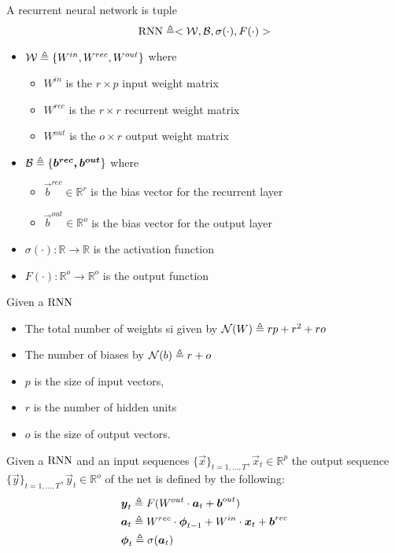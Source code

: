 \begin{defn}
\label{def_rnn}
A recurrent  neural network is tuple
$$\mathrm{RNN}\triangleq< \mathcal{W},\mathcal{B} ,\sigma(\cdot),F(\cdot)>$$
\begin{itemize}
 \item $\mathcal{W} \triangleq \{W^{in},W^{rec},W^{out}\}$ where
 \begin{itemize}
  \item $W^{in}$ is the $r\times p$ input weight matrix
  \item $W^{rec}$ is the $r\times r$ recurrent weight matrix
  \item $W^{out}$ is the $o \times r$ output weight matrix
 \end{itemize}
 \item $\mathcal{B} \triangleq \{\boldsymbol{b^{rec},\boldsymbol{b^{out}}}\}$ where
 \begin{itemize}
   \item $\vec{b}^{rec} \in \mathbb{R}^{r}$ is the bias vector for the recurrent layer
   \item $\vec{b}^{out} \in \mathbb{R}^{o}$ is the bias vector for the output layer
 \end{itemize}
 \item $\sigma(\cdot): \mathbb{R}\rightarrow \mathbb{R}$ is the activation function
 \item $F(\cdot): \mathbb{R}^{o}\rightarrow \mathbb{R}^{o}$ is the output function
\end{itemize}
\end{defn}

\begin{remark}{}
Given a $\mathrm{RNN}$
\begin{itemize}
 \item The total number of weights si given by $\mathcal{N}(W) \triangleq rp+r^2+ro$
 \item The number of biases by $\mathcal{N}(b) \triangleq r+o $
 \item $p$ is the size of input vectors, 
 \item$r$ is the number of hidden units
 \item $o$ is the size of output vectors. 
\end{itemize}
\end{remark}

\begin{defn}
\label{def_rnn_output}
Given a $\mathrm{RNN}$ and an input sequences $\{\vec{x}\}_{t=1,...,T}, \vec{x}_t \in \mathbb{R}^p$ the output sequence $\{\vec{y}\}_{t=1,...,T}, \vec{y}_t \in \mathbb{R}^o$ of the net is defined by the following:
\begin{align}
&\boldsymbol{y}_t \triangleq F(W^{out}\cdot\boldsymbol{a}_t + \boldsymbol{b}^{out})\\
&\boldsymbol{a}_t \triangleq W^{rec}\cdot\boldsymbol{\phi}_{t-1}+W^{in}\cdot\boldsymbol{x}_t+\boldsymbol{b}^{rec}\\
&\boldsymbol{\phi}_t \triangleq  \sigma(\boldsymbol{a}_t)
\end{align}
\end{defn}


